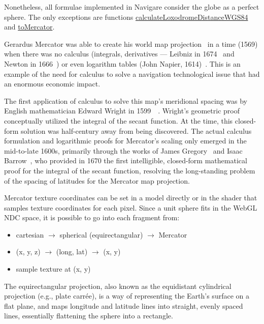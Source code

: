 \documentclass[conference]{IEEEtran}
\begin{document}
\vspace{0.5cm}
Nonetheless, all formulae implemented in Navigare consider the globe as a perfect sphere.
The only exceptions are functions
\href{https://krotalias.github.io/cwdc/13-webgl/extras/doc-light/global.html#calculateLoxodromeDistanceWGS84}{calculateLoxodromeDistanceWGS84}
and \href{https://krotalias.github.io/cwdc/13-webgl/extras/doc-light/global.html#toMercator}{toMercator}.

Gerardus Mercator was able to create his world map projection~\cite{Mercator1569Nova}
in a time (1569) when there was no calculus
(integrals, derivatives — Leibniz in 1674~\cite{Leibniz1684} and Newton in 1666~\cite{Newton1967Whiteside}) or
even logarithm tables (John Napier, 1614)~\cite{Napier1614}.
This is an example of the need for calculus to solve a navigation technological issue
that had an enormous economic impact.

The first application of calculus to solve this
map's meridional spacing was by English mathematician Edward Wright
in 1599~\cite{wright1599errors}~\cite{wright1610errors}.
Wright's geometric proof conceptually utilized the integral of the secant function.
At the time, this closed-form solution was half-century away from being discovered.
The actual calculus formulation and logarithmic proofs for Mercator's scaling only
emerged in the mid-to-late 1600s, primarily through the works of James Gregory~\cite{Gregory1668}
and Isaac Barrow~\cite{Barrow1670}, who provided in 1670 the first intelligible,
closed-form mathematical proof for the integral of the secant function,
resolving the long-standing problem of the spacing of latitudes for the Mercator map projection.

Mercator texture coordinates can be set in a model directly or in the shader that
samples texture coordinates for each pixel. Since a unit sphere fits in the WebGL NDC space,
it is possible to go into each fragment from:

\begin{itemize}
    \item  cartesian $\rightarrow$ spherical (equirectangular) $\rightarrow$ Mercator
    \item  (x, y, z) $\rightarrow$ (long, lat) $\rightarrow$ (x, y)
    \item  sample texture at (x, y)
\end{itemize}

The equirectangular projection, also known as the equidistant cylindrical projection (e.g., plate carrée),
is a way of representing the Earth's surface on a flat plane, and maps longitude and latitude lines into straight,
evenly spaced lines, essentially flattening the sphere into a rectangle.
\end{document}
